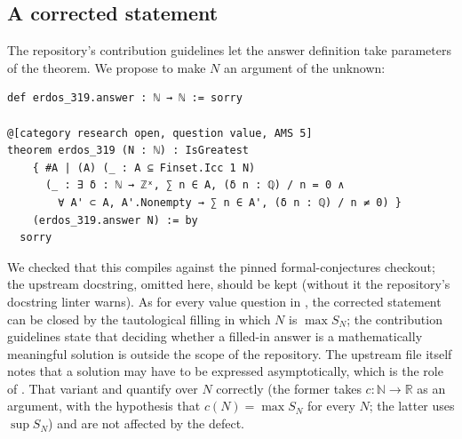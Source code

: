 \documentclass[11pt]{amsart}
\theoremstyle{plain}
\theoremstyle{definition}
\newcommand{\N}{\mathbb{N}}
\newcommand{\R}{\mathbb{R}}
\begin{document}
\subsection*{A corrected statement}
The repository's contribution guidelines let the answer definition take parameters of the theorem. We propose to make $N$ an argument of the unknown:
\begin{lstlisting}
def erdos_319.answer : ℕ → ℕ := sorry

@[category research open, question value, AMS 5]
theorem erdos_319 (N : ℕ) : IsGreatest
    { #A | (A) (_ : A ⊆ Finset.Icc 1 N)
      (_ : ∃ δ : ℕ → ℤˣ, ∑ n ∈ A, (δ n : ℚ) / n = 0 ∧
        ∀ A' ⊂ A, A'.Nonempty → ∑ n ∈ A', (δ n : ℚ) / n ≠ 0) }
    (erdos_319.answer N) := by
  sorry
\end{lstlisting}
We checked that this compiles against the pinned formal-conjectures checkout; the upstream docstring, omitted here, should be kept (without it the repository's docstring linter warns). As for every value question in \cite{FC}, the corrected statement can be closed by the tautological filling in which  $N$ is $\max S_N$; the contribution guidelines state that deciding whether a filled-in answer is a mathematically meaningful solution is outside the scope of the repository. The upstream file itself notes that a solution may have to be expressed asymptotically, which is the role of . That variant and  quantify over $N$ correctly (the former takes $c\colon\N\to\R$ as an argument, with the hypothesis that $c(N)=\max S_N$ for every $N$; the latter uses $\sup S_N$) and are not affected by the defect.
\end{document}
